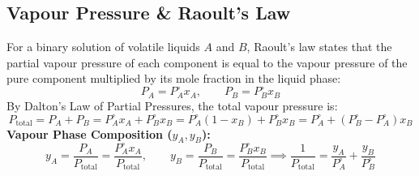 \documentclass[10pt,twoside,openright]{book}
\begin{document}
\subsection{Vapour Pressure \& Raoult's Law}
For a binary solution of volatile liquids $A$ and $B$, Raoult's law states that the partial vapour pressure of each component is equal to the vapour pressure of the pure component multiplied by its mole fraction in the liquid phase:
\begin{equation}
  P_A = P_A^\circ x_A, \qquad P_B = P_B^\circ x_B
\end{equation}
By Dalton's Law of Partial Pressures, the total vapour pressure is:
\begin{equation}
  P_{\text{total}} = P_A + P_B = P_A^\circ x_A + P_B^\circ x_B = P_A^\circ(1 - x_B) + P_B^\circ x_B = P_A^\circ + (P_B^\circ - P_A^\circ)x_B
\end{equation}
\textbf{Vapour Phase Composition ($y_A, y_B$):}
\begin{equation}
  y_A = \frac{P_A}{P_{\text{total}}} = \frac{P_A^\circ x_A}{P_{\text{total}}}, \qquad y_B = \frac{P_B}{P_{\text{total}}} = \frac{P_B^\circ x_B}{P_{\text{total}}} \implies \frac{1}{P_{\text{total}}} = \frac{y_A}{P_A^\circ} + \frac{y_B}{P_B^\circ}
\end{equation}
\end{document}
